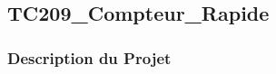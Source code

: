 \documentclass[a4paper,12pt]{report}
\begin{document}
\newpage
\subsection{TC209\_Compteur\_Rapide}
\begin{center}
\label{}
\end{center}
\subsubsection{Description du Projet}
\end{document}
